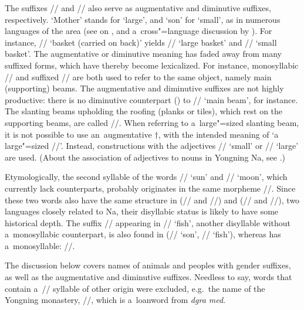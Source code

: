 The suffixes // and // also serve as augmentative and diminutive suffixes,
respectively. ‘Mother’ stands for ‘large’, and ‘son’ for ‘small’, as in numerous languages of the
area (see \citealt{mazaudon2003b} on , and a~cross"=language discussion by \citealt{matisoff1992}). For
instance, // ‘basket (carried on back)’ yields // ‘large basket’ and
// ‘small basket’. The augmentative or diminutive
meaning has faded away from many suffixed forms, which have thereby become lexicalized. For instance, {monosyllabic} // and suffixed // are both used to refer to the same object, namely main
(supporting) beams. The augmentative and diminutive suffixes are not highly productive: there is no diminutive counterpart () to // ‘main beam’, for instance. The slanting beams upholding the roofing (planks or tiles), which rest on the supporting beams, are called //. When referring to a~large"=sized slanting beam, it is not possible to use an~augmentative $\dagger$, with the intended meaning of ‘a large"=sized
//’. Instead, constructions with the adjectives // ‘small’ or // ‘large’ are used. (About the association of adjectives to nouns in Yongning Na, see .)

Etymologically, the second syllable of the words
// ‘sun’ and // ‘moon’, which currently lack 
counterparts, probably originates in the same morpheme //. Since these two words also have the same structure in  (// and
//) and  (// and //), two languages closely related to Na, their disyllabic status is likely
to have some historical depth. The suffix // appearing in // ‘fish’, another
disyllable without a~{monosyllabic} counterpart, is also found in  (// ‘son’,
// ‘fish’), whereas  has a~{monosyllable}: //.

The discussion below covers names of animals and peoples with gender suffixes, as well as the
augmentative and diminutive suffixes. Needless to say, words
that contain a~// syllable of other origin were excluded, e.g.~the name of the Yongning monastery,
//, which is a~loanword from  \textit{dgra med}. 

